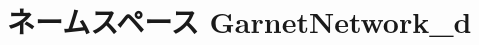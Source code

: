 \hypertarget{namespaceGarnetNetwork__d}{
\section{ネームスペース GarnetNetwork\_\-d}
\label{namespaceGarnetNetwork__d}
}

